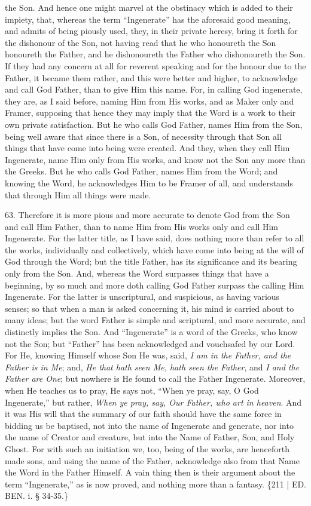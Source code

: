 the Son. And hence one might marvel at the obstinacy which is added to
their impiety, that, whereas the term ``Ingenerate'' has the aforesaid
good meaning, and admits of being piously used, they, in their private
heresy, bring it forth for the dishonour of the Son, not having read
that he who honoureth the Son honoureth the Father, and he
dishonoureth the Father who dishonoureth the Son. If they had any
concern at all for reverent speaking and for the honour due to the
Father, it became them rather, and this were better and higher, to
acknowledge and call God Father, than to give Him this name. For, in
calling God ingenerate, they are, as I said before, naming Him from
His works, and as Maker only and Framer, supposing that hence they may
imply that the Word is a work to their own private satisfaction. But
he who calls God Father, names Him from the Son, being well aware that
since there is a Son, of necessity through that Son all things that
have come into being were created. And they, when they call Him
Ingenerate, name Him only from His works, and know not the Son any
more than the Greeks. But he who calls God Father, names Him from the
Word; and knowing the Word, he acknowledges Him to be Framer of all,
and understands that through Him all things were made.

63. Therefore it is more pious
and more accurate to denote God from the Son and call Him Father, than
to name Him from His works only and call Him Ingenerate. For the
latter title, as I have said, does nothing more than refer to
all the works, individually and collectively, which have come into
being at the will of God through the Word; but the title Father, has
its significance and its bearing only from the Son. And, whereas the
Word surpasses things that have a beginning, by so much and more doth
calling God Father surpass the calling Him Ingenerate. For the latter
is unscriptural, and suspicious, as having various senses; so that
when a man is asked concerning it, his mind is carried about to many
ideas; but the word Father is simple and scriptural, and more
accurate, and distinctly implies the Son. And ``Ingenerate'' is a word
of the Greeks, who know not the Son; but ``Father'' has been
acknowledged and vouchsafed by our Lord. For He, knowing Himself whose
Son He was, said, \emph{I am in the Father, and the Father is in Me};
and, \emph{He that hath seen Me, hath seen the Father}, and \emph{I and
the Father are One}; but nowhere is He found to call the Father
Ingenerate. Moreover, when He teaches us to pray, He says not, ``When
ye pray, say, O God Ingenerate,'' but rather, \emph{When ye pray, say, Our
Father, who art in heaven}. And it was His will that the summary of
our faith should have the same force in bidding us be baptised, not
into the name of Ingenerate and generate, nor into the name of Creator
and creature, but into the Name of Father, Son, and Holy Ghost. For
with such an initiation we, too, being of the works, are henceforth
made sons, and using the name of the Father, acknowledge also from
that Name the Word in the Father Himself. A vain thing then is their
argument about the term ``Ingenerate,'' as is now proved, and nothing
more than a fantasy. \{211 | ED.
BEN. i. § 34-35.\}

